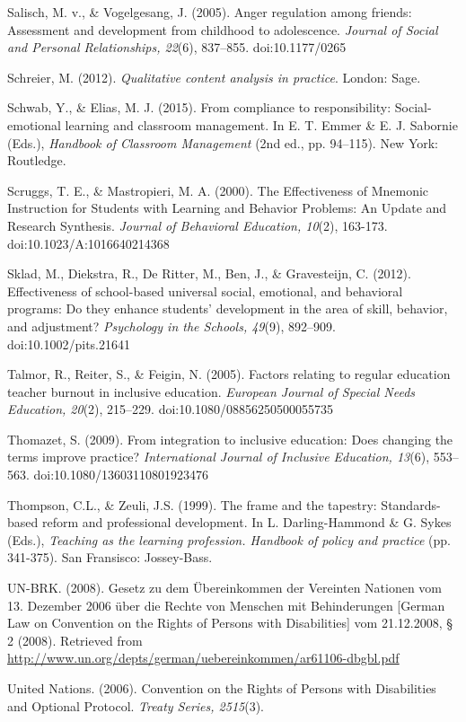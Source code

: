 \documentclass[11.5pt]{sig-alternate} %
\begin{document}
Salisch, M. v., \& Vogelgesang, J. (2005). Anger regulation among friends: Assessment and development from childhood to adolescence. \textit{Journal of Social and Personal Relationships, 22}(6), 837–855. doi:10.1177/0265

Schreier, M. (2012). \textit{Qualitative content analysis in practice}. London: Sage.

Schwab, Y., \& Elias, M. J. (2015). From compliance to responsibility: Social-emotional learning and classroom management. In E. T. Emmer \& E. J. Sabornie (Eds.), \textit{Handbook of Classroom Management} (2nd ed., pp. 94–115). New York: Routledge.

Scruggs, T. E., \& Mastropieri, M. A. (2000). The Effectiveness of Mnemonic Instruction for Students with Learning and Behavior Problems: An Update and Research Synthesis. \textit{Journal of Behavioral Education, 10}(2), 163-173. doi:10.1023/A:1016640214368

Sklad, M., Diekstra, R., De Ritter, M., Ben, J., \& Gravesteijn, C. (2012). Effectiveness of school-based universal social, emotional, and behavioral programs: Do they enhance students’ development in the area of skill, behavior, and adjustment? \textit{Psychology in the Schools, 49}(9), 892–909. doi:10.1002/pits.21641 

Talmor, R., Reiter, S., \& Feigin, N. (2005). Factors relating to regular education teacher burnout in inclusive education. \textit{European Journal of Special Needs Education, 20}(2), 215–229. doi:10.1080/08856250500055735

Thomazet, S. (2009). From integration to inclusive education: Does changing the terms improve practice? \textit{International Journal of Inclusive Education, 13}(6), 553–563. doi:10.1080/13603110801923476

Thompson, C.L., \& Zeuli, J.S. (1999). The frame and the tapestry: Standards-based reform and professional development. In L. Darling-Hammond \& G. Sykes (Eds.), \textit{Teaching as the learning profession. Handbook of policy and practice} (pp. 341-375). San Fransisco: Jossey-Bass.

UN-BRK. (2008). Gesetz zu dem Übereinkommen der Vereinten Nationen vom 13. Dezember 2006 über die Rechte von Menschen mit Behinderungen [German Law on Convention on the Rights of Persons with Disabilities] vom 21.12.2008, § 2 (2008). Retrieved from \url{http://www.un.org/depts/german/uebereinkommen/ar61106-dbgbl.pdf}

United Nations. (2006). Convention on the Rights of Persons with Disabilities and Optional Protocol. \textit{Treaty Series, 2515}(3). 
\end{document}
